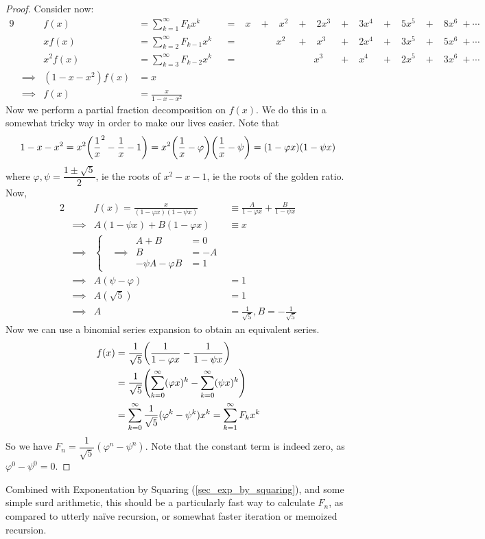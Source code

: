 \begin{proof}
Consider now:
\begin{alignat*}{9}
&& f(x) &= \sum_{k = 1}^\infty F_k x^k
    &&=&\; x\; &+&\; x^2\; &+&\; 2x^3\; &+&\;
        3x^4\; &+&\; 5x^5\; &+&\; 8x^6\; + \dotsb \\
&& x f(x) &= \sum_{k = 2}^\infty F_{k - 1} x^k
    &&=&\; &&x^2\; &+&\; x^3\; &+&\; 2x^4\; &+&\;
        3x^5\; &+&\; 5x^6\; + \dotsb \\
&& x^2 f(x) &= \sum_{k = 3}^\infty F_{k - 2}x^k
    &&=&\; &&&& x^3\; &+&\; x^4\; &+&\; 2x^5\; &+&\; 3x^6\; + \dotsb \\
&\implies& (1 - x - x^2) f(x) &= x \\
&\implies& f(x) &= \frac x{1 - x - x^2}
\end{alignat*}
Now we perform a partial fraction decomposition on \(f(x)\). We do this in a
somewhat tricky way in order to make our lives easier. Note that
\begin{equation*}
1 - x - x^2 = x^2 \pqty{\frac 1x^2 - \frac 1x - 1}
    = x^2\pqty{\frac 1x - \varphi}\pqty{\frac 1x - \psi}
    = (1 - \varphi x)(1 - \psi x)
\end{equation*}
where \(\varphi, \psi = \dfrac{1 \pm \sqrt 5}2\), ie the roots of
\(x^2 - x - 1\), ie the roots of the golden ratio. Now,
\begin{alignat*}{2}
&& f(x) = \frac x{(1 - \varphi x)(1 - \psi x)}
    &\equiv \frac A{1 - \varphi x} + \frac B{1 - \psi x} \\
&\implies& A(1 - \psi x) + B(1 - \varphi x) &\equiv x \\
&\implies& \left\{
    \begin{aligned}
        && A + B &= 0 \\
        &\implies& B &= -A  \\
        && -\psi A - \varphi B &= 1
    \end{aligned} \right. \\
&\implies& A(\psi - \varphi) &= 1 \\
&\implies& A(\sqrt 5) &= 1 \\
&\implies& A &= \frac 1{\sqrt 5}, B = -\frac 1{\sqrt 5}
\end{alignat*}
Now we can use a binomial series expansion to obtain an equivalent series.
\begin{align*}
f(x) &= \frac 1{\sqrt 5}\pqty{\frac 1{1 - \varphi x}
                            - \frac 1{1 - \psi x}} \\
&= \frac 1{\sqrt 5}\pqty{\sum_{k = 0}^\infty (\varphi x)^k
                       - \sum_{k = 0}^\infty (\psi x)^k} \\
&= \sum_{k = 0}^\infty \frac 1{\sqrt 5}(\varphi^k - \psi^k)x^k
= \sum_{k = 1}^\infty F_k x^k
\end{align*}
So we have \(F_n = \dfrac 1{\sqrt 5}(\varphi^n - \psi^n)\). Note that the
constant term is indeed zero, as \(\varphi^0 - \psi^0 = 0\).
\end{proof}
Combined with Exponentation by Squaring (\ref{sec_exp_by_squaring}), and
some simple surd arithmetic, this should be a particularly fast way to
calculate \(F_n\), as compared to utterly na\"ive recursion, or somewhat
faster iteration or memoized recursion.

